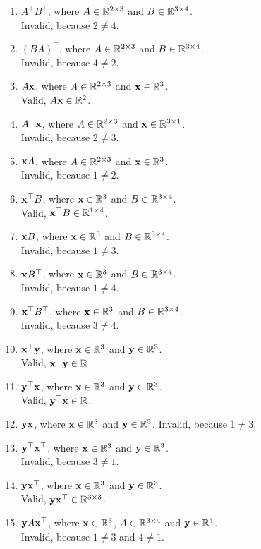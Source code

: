 \documentclass[twocolumn]{article}
\begin{document}
\begin{enumerate}
  \item $A^\top B^\top$, where $A \in \mathbb{R}^{2 \times 3}$ and $B \in \mathbb{R}^{3
      \times 4}$.
    \\
    Invalid, because $2 \ne 4$.
  \item $(BA)^\top$, where $A \in \mathbb{R}^{2 \times 3}$ and $B \in \mathbb{R}^{3 \times 4}$.
    \\
    Invalid, because $4 \ne 2$.
  \item $A\mathbf{x}$, where $A \in \mathbb{R}^{2 \times 3}$ and $\mathbf{x} \in \mathbb{R}^{3}$.
    \\
    Valid, $A\mathbf{x} \in \mathbb{R}^{2}$. 
  \item $A^\top\mathbf{x}$, where $A \in \mathbb{R}^{2 \times 3}$ and $\mathbf{x} \in \mathbb{R}^{3
      \times 1}$.
    \\
    Invalid, because $2 \ne 3$.
  \item $\mathbf{x} A$, where $A \in \mathbb{R}^{2 \times 3}$ and $\mathbf{x} \in \mathbb{R}^{3}$.
    \\
    Invalid, because $1 \ne 2$.
  \item $\mathbf{x}^\top B$, where $\mathbf{x} \in \mathbb{R}^{3}$ and $B \in \mathbb{R}^{3 \times 4}$.
    \\
    Valid, $\mathbf{x}^\top B \in \mathbb{R}^{1 \times 4}$.
  \item $\mathbf{x} B$, where $\mathbf{x} \in \mathbb{R}^{3}$ and $B \in \mathbb{R}^{3 \times 4}$.
    \\
    Invalid, because $1 \ne 3$.
  \item $\mathbf{x} B^\top$, where $\mathbf{x} \in \mathbb{R}^{3}$ and $B \in \mathbb{R}^{3 \times 4}$.
    \\
    Invalid, because $1 \ne 4$.
  \item $\mathbf{x}^\top B^\top$, where $\mathbf{x} \in \mathbb{R}^{3}$ and $B \in \mathbb{R}^{3 \times 4}$.
    \\
    Invalid, because $3 \ne 4$.
  \item $\mathbf{x}^\top \mathbf{y}$, where $\mathbf{x} \in \mathbb{R}^{3}$ and $\mathbf{y} \in \mathbb{R}^{3}$.
    \\
    Valid, $\mathbf{x}^\top \mathbf{y} \in \mathbb{R}$.
  \item $\mathbf{y}^\top \mathbf{x}$, where $\mathbf{x} \in \mathbb{R}^{3}$ and $\mathbf{y} \in \mathbb{R}^{3}$.
    \\
    Valid, $\mathbf{y}^\top \mathbf{x} \in \mathbb{R}$.
  \item $\mathbf{y} \mathbf{x}$, where $\mathbf{x} \in \mathbb{R}^{3}$ and $\mathbf{y} \in \mathbb{R}^{3}$.
    Invalid, because $1 \ne 3$.
  \item $\mathbf{y}^\top \mathbf{x}^\top$, where $\mathbf{x} \in \mathbb{R}^{3}$ and $\mathbf{y} \in \mathbb{R}^{3}$.
    \\
    Invalid, because $3 \ne 1$.
  \item $\mathbf{y} \mathbf{x}^\top$, where $\mathbf{x} \in \mathbb{R}^{3}$ and $\mathbf{y} \in \mathbb{R}^{3}$.
    \\
    Valid, $\mathbf{y} \mathbf{x}^\top \in \mathbb{R}^{3 \times 3}$.
  \item $\mathbf{y} A \mathbf{x}^\top$, where $\mathbf{x} \in \mathbb{R}^{3}$, $A \in \mathbb{R}^{3 \times 4}$ and $\mathbf{y} \in \mathbb{R}^{4}$.
    \\
    Invalid, because $1\ne 3$ and $4\ne 1$.
    

\end{enumerate}
\end{document}
